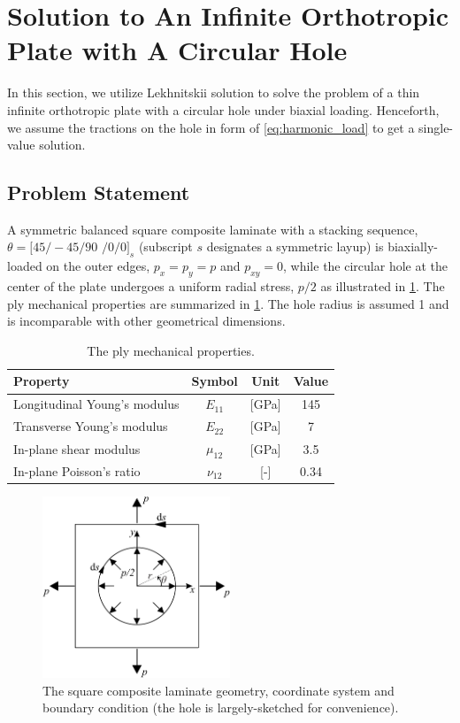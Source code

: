 \documentclass{article}
\begin{document}
\section{Solution to An Infinite Orthotropic Plate with A Circular Hole}
In this section, we utilize Lekhnitskii solution to solve the problem of a thin infinite orthotropic plate with a circular hole under biaxial loading. Henceforth, we assume the tractions on the hole in form of \cref{eq:harmonic_load} to get a single-value solution.

\subsection{Problem Statement}
A symmetric balanced square composite laminate with a stacking sequence, $\theta = [45/-45/90$ $/0/0]_s$ (subscript $s$ designates a symmetric layup) is biaxially-loaded on the outer edges, $p_x = p_y = p$ and $p_{xy} = 0$, while the circular hole at the center of the plate undergoes a uniform radial stress, $p/2$ as illustrated in \cref{fig:problem}. The ply mechanical properties are summarized in \cref{tab:mech_prop}. The hole radius is assumed 1 and is incomparable with other geometrical dimensions.

\begin{table}[ht]
    \centering
    \caption{The ply mechanical properties.}
    \begin{tabular}{lccc} \hline
        Property & Symbol & Unit & Value \\ \hline
        Longitudinal Young's modulus & $E_{11}$ & [GPa] & 145 \\
        Transverse Young's modulus & $E_{22}$ & [GPa] & 7 \\
        In-plane shear modulus & $\mu_{12}$ & [GPa] & 3.5 \\
        In-plane Poisson's ratio & $\nu_{12}$ & [-] & 0.34 \\\hline
    \end{tabular} 
    \label{tab:mech_prop}
\end{table}

\begin{figure}[ht]
    \centering
    \includegraphics[width = 0.5\textwidth ]{figures/problem.pdf}
    \caption{The square composite laminate geometry, coordinate system and boundary condition (the hole is largely-sketched for convenience).}
    \label{fig:problem}
\end{figure}
\end{document}
